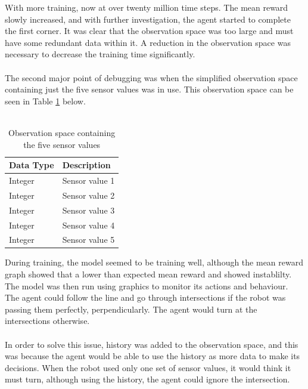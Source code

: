 \documentclass[a4paper,12pt]{article}
\begin{document}
\noindent
With more training, now at over twenty million time steps. The mean reward slowly increased, and with further investigation, the agent started to complete the first corner. It was clear that the observation space was too large and must have some redundant data within it. A reduction in the observation space was necessary to decrease the training time significantly. 
\\\\
The second major point of debugging was when the simplified observation space containing just the five sensor values was in use. This observation space can be seen in Table \ref{tab:Observation space containing the five sensor values} below. 
\\\\
\begin{table}[H]
\centering
\caption{Observation space containing the five sensor values}
\label{tab:Observation space containing the five sensor values}
\begin{tabular}{|ll|}
\hline
\textbf{Data Type} & \textbf{Description}\\ \hline
Integer & Sensor value 1\\ 
Integer & Sensor value 2\\ 
Integer & Sensor value 3\\ 
Integer & Sensor value 4\\ 
Integer & Sensor value 5\\ \hline
\end{tabular}
\end{table}
\noindent
During training, the model seemed to be training well, although the mean reward graph showed that a lower than expected mean reward and showed instablilty. The model was then run using graphics to monitor its actions and behaviour. The agent could follow the line and go through intersections if the robot was passing them perfectly, perpendicularly. The agent would turn at the intersections otherwise. 
\\\\
In order to solve this issue, history was added to the observation space, and this was because the agent would be able to use the history as more data to make its decisions. When the robot used only one set of sensor values, it would think it must turn, although using the history, the agent could ignore the intersection. 
\end{document}
